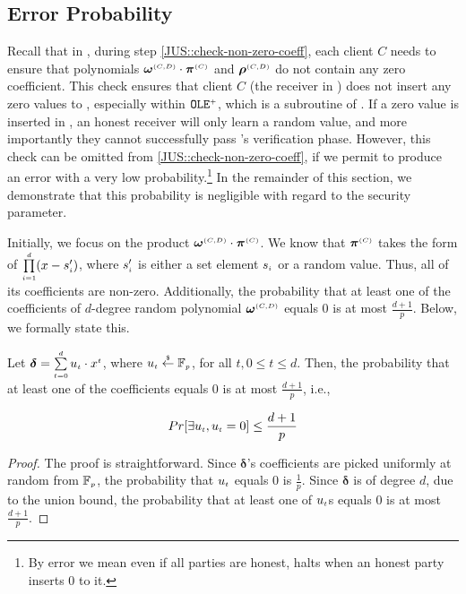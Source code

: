 

\subsection{Error Probability}\label{sec::error-prob}


Recall that in \fpsi, during step \ref{JUS::check-non-zero-coeff},  each client $C$ needs to ensure that polynomials $\bm\omega^{\scriptscriptstyle (C,D)}\cdot \bm\pi^{\scriptscriptstyle  {  {(C)}}}$ and  $\bm\rho^{\scriptscriptstyle (C,D)}$ do not contain any zero coefficient. This check ensures that client $C$ (the receiver in \vopr) does not insert any zero values to  \vopr, especially within $\mathtt{OLE}^{\scriptscriptstyle +}$, which is a subroutine of \vopr. If a zero value is inserted in \vopr, an honest receiver will only learn a random value, and more importantly they cannot successfully pass \vopr's verification phase. 
%
However, this check can be omitted from \ref{JUS::check-non-zero-coeff}, if we permit \fpsi to produce an error with a very low probability.\footnote{By error we mean even if all parties are honest,  \vopr halts when an honest party inserts $0$ to it.} In the remainder of this section, we demonstrate that this probability is negligible with regard to the security parameter. 


Initially, we focus on the product $\bm\omega^{\scriptscriptstyle (C,D)}\cdot \bm\pi^{\scriptscriptstyle  {  {(C)}}}$. We know that $\bm\pi^{\scriptscriptstyle  {  {(C)}}}$ takes the form of  $\prod\limits^{\scriptscriptstyle d}_{\scriptscriptstyle i=1} (x-s'_{\scriptscriptstyle i})$, where $s'_{\scriptscriptstyle i}$ is either a set element $s_{\scriptscriptstyle i}$ or a random value.  Thus, all of its coefficients are non-zero. Additionally, the probability that at least one of the coefficients  of $d$-degree random polynomial $\bm\omega^{\scriptscriptstyle (C,D)}$ equals $0$ is at most $\frac{d+1}{p}$.  Below, we formally state this.


\begin{theorem}\label{theorem::zero-coeff-in-ran-poly}
Let $\bm\delta=\sum\limits_{\scriptscriptstyle t=0}^{\scriptscriptstyle d}u_{\scriptscriptstyle  t} \cdot x^{\scriptscriptstyle t}$, where  $u_{\scriptscriptstyle  t}\stackrel{\scriptscriptstyle\$}\leftarrow\mathbb{F}_{\scriptscriptstyle p}$, for all $t, 0\leq t\leq d$. Then, the probability that at least one of the coefficients equals $0$ is at most $\frac{d+1}{p}$, i.e., 

$$Pr[\exists u_{\scriptscriptstyle t}, u_{\scriptscriptstyle t}=0]\leq \frac{d+1}{p}$$
\end{theorem}


\begin{proof}
The proof is straightforward. Since $\bm\delta$'s coefficients are picked uniformly at random from  $\mathbb{F}_{\scriptscriptstyle p}$, the probability that $u_{\scriptscriptstyle t}$ equals $0$ is $\frac{1}{p}$. Since $\bm\delta$ is of degree $d$, due to the union bound, the probability that at least one of $u_{\scriptscriptstyle t}$s equals $0$ is at most $\frac{d+1}{p}$. 
%
 \end{proof}



